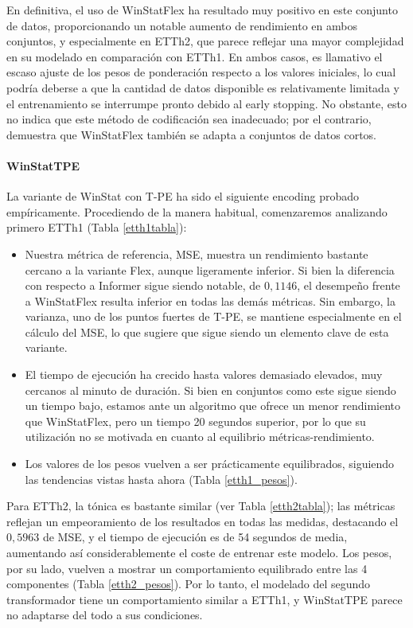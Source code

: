  En definitiva, el uso de WinStatFlex ha resultado muy positivo en este conjunto de datos, proporcionando un notable aumento de rendimiento en ambos conjuntos, y especialmente en ETTh2, que parece reflejar una mayor complejidad en su modelado en comparación con ETTh1. En ambos casos, es llamativo el escaso ajuste de los pesos de ponderación respecto a los valores iniciales, lo cual podría deberse a que la cantidad de datos disponible es relativamente limitada y el entrenamiento se interrumpe pronto debido al early stopping. No obstante, esto no indica que este método de codificación sea inadecuado; por el contrario, demuestra que WinStatFlex también se adapta a conjuntos de datos cortos.
 
 \paragraph{WinStatTPE}
 
 La variante de WinStat con T-PE ha sido el siguiente encoding probado empíricamente. Procediendo de la manera habitual, comenzaremos analizando primero ETTh1 (Tabla \ref{etth1tabla}):
 
 \begin{itemize}
 	\item Nuestra métrica de referencia, MSE, muestra un rendimiento bastante cercano a la variante Flex, aunque ligeramente inferior. Si bien la diferencia con respecto a Informer sigue siendo notable, de $0,1146$, el desempeño frente a WinStatFlex resulta inferior en todas las demás métricas. Sin embargo, la varianza, uno de los puntos fuertes de T-PE, se mantiene especialmente en el cálculo del MSE, lo que sugiere que sigue siendo un elemento clave de esta variante.
 	
 	\item El tiempo de ejecución ha crecido hasta valores demasiado elevados, muy cercanos al minuto de duración. Si bien en conjuntos como este sigue siendo un tiempo bajo, estamos ante un algoritmo que ofrece un menor rendimiento que WinStatFlex, pero un tiempo 20 segundos superior, por lo que su utilización no se motivada en cuanto al equilibrio métricas-rendimiento.
 	\item Los valores de los pesos vuelven a ser prácticamente equilibrados, siguiendo las tendencias vistas hasta ahora (Tabla \ref{etth1_pesos}).
 \end{itemize}
 
 Para ETTh2, la tónica es bastante similar (ver Tabla \ref{etth2tabla}); las métricas reflejan un empeoramiento de los resultados en todas las medidas, destacando el $0,5963$ de MSE, y el tiempo de ejecución es de 54 segundos de media, aumentando así considerablemente el coste de entrenar este modelo. Los pesos, por su lado, vuelven a mostrar un comportamiento equilibrado entre las 4 componentes (Tabla \ref{etth2_pesos}). Por lo tanto, el modelado del segundo transformador tiene un comportamiento similar a ETTh1, y WinStatTPE parece no adaptarse del todo a sus condiciones.\\
 
